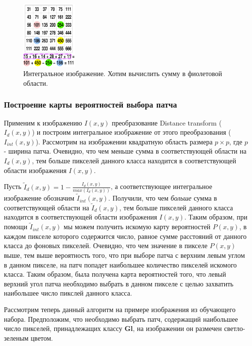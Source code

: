 \begin{figure}[H]
    \centering
    \includegraphics[width=0.25\textwidth]{pics/summedup2.png}
    \caption{Интегральное изображение. Хотим вычислить сумму в фиолетовой области.}
    \label{fig:summed2}
\end{figure}

\subsubsection{Построение карты вероятностей выбора патча}
Применим к изображению $I(x,y)$ преобразование Distance transform ($I_{d}(x, y)$) и построим интегральное изображение от этого преобразования ($I_{int}(x,y)$). Рассмотрим на изображении квадратную область размера $p \times p$, где $p$ - ширина патча. Очевидно, что чем меньше сумма в соответствующей области на $I_{d}(x,y)$,
тем больше пикселей данного класса находится в соответствующей области изображения $I(x,y)$. 
\par Пусть $\tilde{I}_{d}(x,y) = 1 - \frac{I_{d}(x,y)}{max(I_{d}(x,y))}$, а соответствующее интегральное изображение обозначим $\tilde{I}_{int}(x,y)$. Получили, что чем \textit{больше} сумма в соответствующей области на $\tilde{I}_{d}(x,y)$, тем больше пикселей данного класса находится в соответствующей области изображения $I(x,y)$. Таким образом, при помощи $\tilde{I}_{int}(x,y)$ мы можем получить искомую карту вероятностей $P(x,y)$, в каждом пикселе которого содержится число, равное сумме расстояний от данного класса до фоновых пикселей. Очевидно, что чем значение в пикселе $P(x,y)$ выше, тем выше вероятность того, что при выборе патча с верхним левым углом в данном пикселе, на патч попадет наибольшее количество пикселей искомого класса. Таким образом, была получена карта вероятностей того, что левый верхний угол патча необходимо выбрать в данном пикселе с целью захватить наибольшее число пикслей данного класса.
\par Рассмотрим теперь данный алгоритм на примере изображения из обучающего набора. Предположим, что необходимо выбрать патч, содержащий наибольшее число пикселей, принадлежащих классу \textbf{Gl}, на изображении он размечен светло-зеленым цветом.
